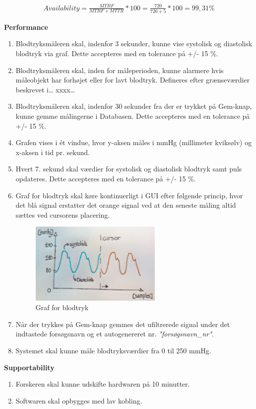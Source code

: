				\begin{align}
					Availability = \frac{MTBF}{MTBF+MTTR}*100 = \frac{720}{720+5}*100 = 99,31 \%
				\end{align}



\textbf{Performance}
\begin{enumerate}
\item Blodtryksmåleren skal, indenfor 3 sekunder, kunne vise systolisk og diastolisk blodtryk via graf. Dette accepteres med en tolerance på +/- 15 \%.
\item Blodtryksmåleren skal, inden for måleperioden, kunne alarmere hvis måleobjekt har forhøjet eller for lavt blodtryk. Defineres efter grænseværdier beskrevet i… xxxx…
\item Blodtryksmåleren skal, indenfor 30 sekunder fra der er trykket på Gem-knap, kunne gemme målingerne i Databasen.  Dette accepteres med en tolerance på +/- 15 \%.
\item Grafen vises i ét vindue, hvor y-aksen måles i mmHg (millimeter kviksølv) og x-aksen i tid pr. sekund. 
\item Hvert 7. sekund skal værdier for systolisk og diastolisk blodtryk samt puls opdateres. Dette accepteres med en tolerance på +/- 15 \%.
\item Graf for blodtryk skal køre kontinuerligt i GUI efter følgende princip, hvor det blå signal erstatter det orange signal ved at den seneste måling altid sættes ved cursorens placering.
\begin{figure}[H]
	\centering
	\includegraphics[width=0.6\textwidth]{Figurer/Cursor}
	\caption{Graf for blodtryk}
	\label{fig:Graf for blodtryks visning}
\end{figure}

\item Når der trykkes på Gem-knap gemmes det ufiltrerede signal under det indtastede forsøgsnavn og et autogenereret nr. \textit{"forsøgsnavn\_nr"}.
\item Systemet skal kunne måle blodtryksværdier fra 0 til 250 mmHg.
\end{enumerate}


\textbf{Supportability}
\begin{enumerate}
\item Forskeren skal kunne udskifte hardwaren på 10 minutter. 
\item Softwaren skal opbygges med lav kobling. 
\end{enumerate}
















